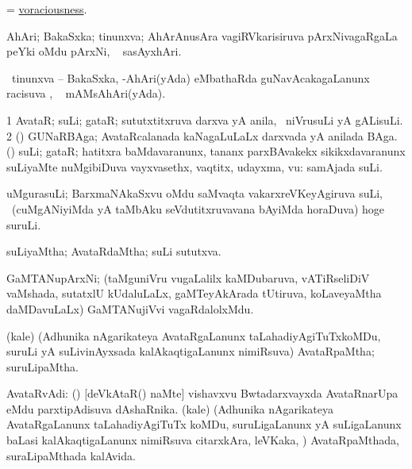 \bentry 
{} 
\gl{\nA}
\expl{}
\bmng
 = \hyperlink{voraciousness}{voraciousness}. 
\emng
\eentry

\bentry
{} 
\gl{\saupa}
\expl{}
\bmng
 \eng{-} AhAri; \eng{-} BakaSxka; \eng{-} tinunxva; AhArAnusAra vagiRVkarisiruva pArxNivagaRgaLa peYki oMdu pArxNi, \udA\  sasAyxhAri. 
\emng
\eentry

\bentry
{} 
\gl{\saupa}
\expl{}
\bmng
 \sA\ tinunxva -- BakaSxka, -AhAri(yAda) eMbathaRda guNavAcakagaLanunx racisuva \saupa , \udA\  mAMsAhAri(yAda). 
\emng
\eentry

\bentry
{} 
\gl{\nA}
\bmng
\bnum
\num{1} AvataR; suLi; gataR; sututxtitxruva darxva yA anila, \kanmu\ niVrusuLi yA gALisuLi. 
\num{2} (\Bwvi) GUNaRBAga; AvataRcalanada kaNagaLuLaLx darxvada yA anilada BAga. (\rUpa) suLi; gataR; hatitxra baMdavaranunx, tananx parxBAvakekx sikikxdavaranunx suLiyaMte nuMgibiDuva vayxvasethx, vaqtitx, udayxma, \mo vu:  samAjada suLi. 
\enum
\emng
\eentry
 
\bentry
{} 
\gl{\nA}
\expl{}
\bmng
uMgurasuLi; BarxmaNAkaSxvu oMdu saMvaqta vakarxreVKeyAgiruva suLi, \udA\ (cuMgANiyiMda yA taMbAku seVdutitxruvavana bAyiMda horaDuva) hoge suruLi. 
\emng
\eentry

\bentry 
{} 
\gl{\gu}
\expl{}
\bmng
 suLiyaMtha; AvataRdaMtha; suLi sututxva. 
\emng
\eentry

\bentry 
{} 
\gl{\nA}
\expl{}
\bmng
 GaMTANupArxNi; (taMguniVru \mo vugaLalilx kaMDubaruva, vATiRseliDiV vaMshada, sutatxlU kUdaluLaLx, gaMTeyAkArada tUtiruva, koLaveyaMtha daMDavuLaLx) GaMTANujiVvi vagaRdalolxMdu. 
\emng
\eentry

\bentry
{} 
\gl{\nA}
\expl{}
\bmng
 (kale) (Adhunika nAgarikateya AvataRgaLanunx taLahadiyAgiTuTxkoMDu, suruLi yA suLivinAyxsada kalAkaqtigaLanunx nimiRsuva) AvataRpaMtha; suruLipaMtha. 
\emng
\eentry

\bentry 
{} 
\gl{\nA}
\expl{}
\bmng
 AvataRvAdi: 
\banum
{} (\tashA) [deVkAtaR() naMte] vishavxvu Bwtadarxvayxda AvataRnarUpa eMdu parxtipAdisuva dAshaRnika. 
 (kale) (Adhunika nAgarikateya AvataRgaLanunx taLahadiyAgiTuTx koMDu, suruLigaLanunx yA suLigaLanunx baLasi kalAkaqtigaLanunx nimiRsuva citarxkAra, leVKaka, \mo) AvataRpaMthada, suraLipaMthada kalAvida. 
\eanum
\emng
\eentry

